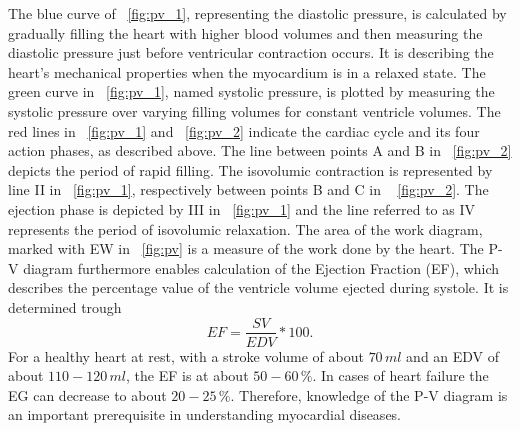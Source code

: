 The blue curve of \figurename~\ref{fig:pv_1}, representing the diastolic pressure, is calculated by gradually filling the heart with higher blood volumes and then measuring the diastolic pressure just before ventricular contraction occurs. It is describing the heart's mechanical properties when the myocardium is in a relaxed state. The green curve in \figurename~\ref{fig:pv_1}, named systolic pressure, is plotted by measuring the systolic pressure over varying filling volumes for constant ventricle volumes. The red lines in \figurename~\ref{fig:pv_1} and \figurename~\ref{fig:pv_2} indicate the cardiac cycle and its four action phases, as described above. The line between points A and B in \figurename~\ref{fig:pv_2} depicts the period of rapid filling. The isovolumic contraction is represented by line II in \figurename~\ref{fig:pv_1}, respectively between points B and C in \figurename~ \ref{fig:pv_2}. The ejection phase is depicted by III in \figurename~\ref{fig:pv_1} and the line referred to as IV represents the period of isovolumic relaxation. The area of the work diagram, marked with EW in \figurename~\ref{fig:pv} is a measure of the work done by the heart. The P-V diagram furthermore enables calculation of the Ejection Fraction (EF), which describes the percentage value of the ventricle volume ejected during systole. It is determined trough
\begin{equation}
  EF = \frac{SV}{EDV}*100.
 \label{eq:EF}
\end{equation}
For a healthy heart at rest, with a stroke volume of about $70 \, ml$ and an EDV of about $110-120 \, ml$, the EF is at about $50-60\, \%$. In cases of heart failure the EG can decrease to about $20-25 \, \%$. Therefore, knowledge of the P-V diagram is an important prerequisite in understanding myocardial diseases. \cite{HKS4}

